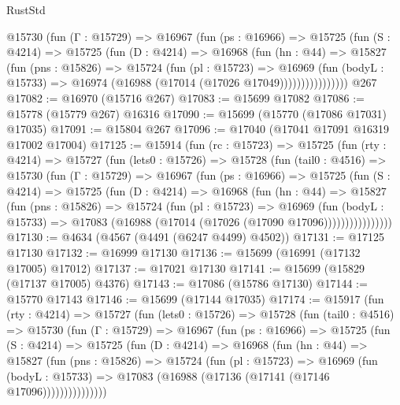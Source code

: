 \begin{lexlean}{RustStd}
\begin{coremodule}
            @15730
              (fun (Γ : @15729) =>
              @16967
                (fun (ps : @16966) =>
                @15725
                  (fun (S : @4214) =>
                  @15725
                    (fun (D : @4214) =>
                    @16968
                      (fun (hn : @44) =>
                      @15827
                        (fun (pns : @15826) =>
                        @15724
                          (fun (pl : @15723) =>
                          @16969
                            (fun (bodyL : @15733) =>
                            @16974 (@16988 (@17014 (@17026 @17049))))))))))))))))
    @267
@17082 := @16970 (@15716 @267)
@17083 := @15699 @17082
@17086 := @15778 (@15779 @267) @16316
@17090 := @15699 (@15770 (@17086 @17031) @17035)
@17091 := @15804 @267
@17096 := @17040 (@17041 @17091 @16319 @17002 @17004)
@17125 := @15914
    (fun (rc : @15723) =>
    @15725
      (fun (rty : @4214) =>
      @15727
        (fun (lets0 : @15726) =>
        @15728
          (fun (tail0 : @4516) =>
          @15730
            (fun (Γ : @15729) =>
            @16967
              (fun (ps : @16966) =>
              @15725
                (fun (S : @4214) =>
                @15725
                  (fun (D : @4214) =>
                  @16968
                    (fun (hn : @44) =>
                    @15827
                      (fun (pns : @15826) =>
                      @15724
                        (fun (pl : @15723) =>
                        @16969
                          (fun (bodyL : @15733) =>
                          @17083 (@16988 (@17014 (@17026 (@17090 @17096))))))))))))))))
@17130 := @4634 (@4567 (@4491 (@6247 @4499) @4502))
@17131 := @17125 @17130
@17132 := @16999 @17130
@17136 := @15699 (@16991 (@17132 @17005) @17012)
@17137 := @17021 @17130
@17141 := @15699 (@15829 (@17137 @17005) @4376)
@17143 := @17086 (@15786 @17130)
@17144 := @15770 @17143
@17146 := @15699 (@17144 @17035)
@17174 := @15917
    (fun (rty : @4214) =>
    @15727
      (fun (lets0 : @15726) =>
      @15728
        (fun (tail0 : @4516) =>
        @15730
          (fun (Γ : @15729) =>
          @16967
            (fun (ps : @16966) =>
            @15725
              (fun (S : @4214) =>
              @15725
                (fun (D : @4214) =>
                @16968
                  (fun (hn : @44) =>
                  @15827
                    (fun (pns : @15826) =>
                    @15724
                      (fun (pl : @15723) =>
                      @16969
                        (fun (bodyL : @15733) =>
                        @17083 (@16988 (@17136 (@17141 (@17146 @17096)))))))))))))))

\end{coremodule}
\end{lexlean}
